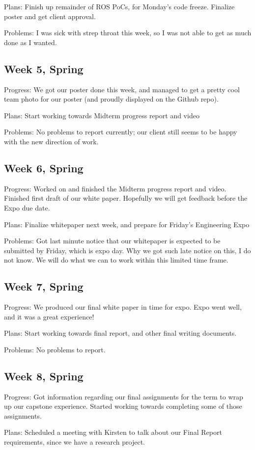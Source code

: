 Plans: Finish up remainder of ROS PoCs, for Monday's code freeze. Finalize poster and get client approval.

Problems: I was sick with strep throat this week, so I was not able to get as much done as I wanted.
\subsection{Week 5, Spring}
Progress: We got our poster done this week, and managed to get a pretty cool team photo for our poster (and proudly displayed on the Github repo).

Plans: Start working towards Midterm progress report and video

Problems: No problems to report currently; our client still seems to be happy with the new direction of work.
\subsection{Week 6, Spring}
Progress: Worked on and finished the Midterm progress report and video. Finished first draft of our white paper. Hopefully we will get feedback before the Expo due date.

Plans: Finalize whitepaper next week, and prepare for Friday's Engineering Expo

Problems: Got last minute notice that our whitepaper is expected to be submitted by Friday, which is expo day. Why we got such late notice on this, I do not know. We will do what we can to work within this limited time frame.
\subsection{Week 7, Spring}
Progress: We produced our final white paper in time for expo. Expo went well, and it was a great experience!

Plans: Start working towards final report, and other final writing documents.

Problems: No problems to report.
\subsection{Week 8, Spring}
Progress: Got information regarding our final assignments for the term to wrap up our capstone experience. Started working towards completing some of those assignments.

Plans: Scheduled a meeting with Kirsten to talk about our Final Report requirements, since we have a research project.

